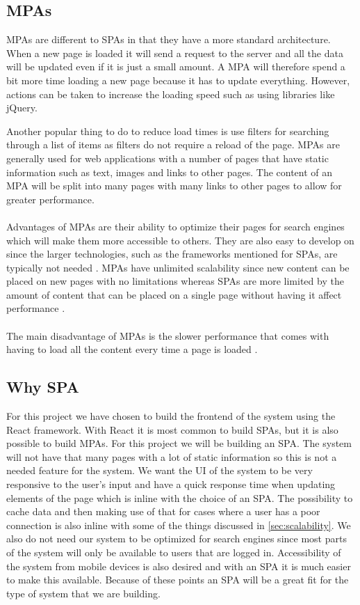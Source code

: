 \subsection{MPAs}
MPAs are different to SPAs in that they have a more standard architecture.
When a new page is loaded it will send a request to the server and all the data will be updated even if it is just a small amount.
A MPA will therefore spend a bit more time loading a new page because it has to update everything.
However, actions can be taken to increase the loading speed such as using libraries like jQuery.

Another popular thing to do to reduce load times is use filters for searching through a list of items as filters do not require a reload of the page.
MPAs are generally used for web applications with a number of pages that have static information such as text, images and links to other pages.
The content of an MPA will be split into many pages with many links to other pages to allow for greater performance.
\\\\
Advantages of MPAs are their ability to optimize their pages for search engines which will make them more accessible to others. 
They are also easy to develop on since the larger technologies, such as the frameworks mentioned for SPAs, are typically not needed \cite{SPAvsMPAMerehead}.
MPAs have unlimited scalability since new content can be placed on new pages with no limitations whereas SPAs are more limited by the amount of content that can be placed on a single page without having it affect performance \cite{SPAvsMPARuby}.
\\\\
The main disadvantage of MPAs is the slower performance that comes with having to load all the content every time a page is loaded \cite{SPAvsMPARuby}.

\subsection{Why SPA}
For this project we have chosen to build the frontend of the system using the React framework. 
With React it is most common to build SPAs, but it is also possible to build MPAs. 
For this project we will be building an SPA.
The system will not have that many pages with a lot of static information so this is not a needed feature for the system.
We want the UI of the system to be very responsive to the user's input and have a quick response time when updating elements of the page which is inline with the choice of an SPA.
The possibility to cache data and then making use of that for cases where a user has a poor connection is also inline with some of the things discussed in \autoref{sec:scalability}.
We also do not need our system to be optimized for search engines since most parts of the system will only be available to users that are logged in.
Accessibility of the system from mobile devices is also desired and with an SPA it is much easier to make this available. 
Because of these points an SPA will be a great fit for the type of system that we are building.
